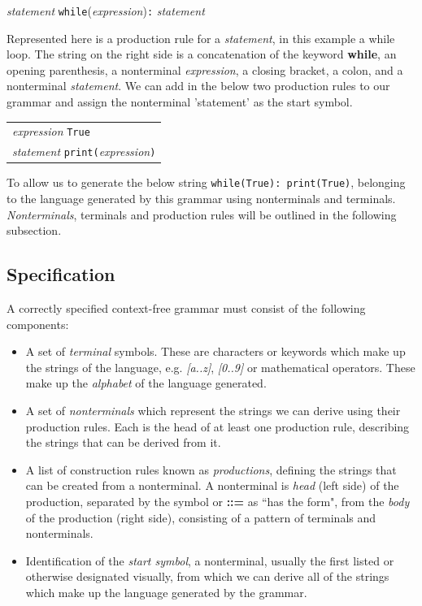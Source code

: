 \documentclass[a4paper, 11pt]{article}
\begin{document}
\begin{center}
	\textit{statement} \textbf{\textrightarrow} \texttt{while}(\textit{expression})\texttt{:} \textit{statement}
\end{center}

\noindent Represented here is a production rule for a \textit{statement}, in this example a while loop. The string on the right side is a concatenation of the keyword \textbf{while}, an opening parenthesis, a nonterminal \textit{expression}, a closing bracket, a colon, and a nonterminal \textit{statement}. We can add in the below two production rules to our grammar and assign the nonterminal 'statement' as the start symbol.

\begin{center}
	\begin{tabular}{l}
		\textit{expression} \textbf{\textrightarrow} \texttt{True} \\
		\textit{statement} \textbf{\textrightarrow} \texttt{print(}\textit{expression}\texttt{)}
	\end{tabular}
\end{center}

To allow us to generate the below string \texttt{while(True): print(True)}, belonging to the language generated by this grammar using nonterminals and terminals. \textit{Nonterminals}, terminals and production rules will be outlined in the following subsection.

\subsection{Specification}
A correctly specified context-free grammar must consist of the following components:

\begin{itemize}
	\item A set of \textit{terminal} symbols. These are characters or keywords which make up the strings of the language, e.g. \textit{[a..z]}, \textit{[0..9]} or mathematical operators. These make up the \textit{alphabet} of the language generated.

	\item A set of \textit{nonterminals} which represent the strings we can derive using their production rules. Each is the head of at least one production rule, describing the strings that can be derived from it.

	\item A list of construction rules known as \textit{productions}, defining the strings that can be created from a nonterminal. A nonterminal is \textit{head} (left side) of the production, separated by the symbol \textbf{\textrightarrow} or \textbf{::=} as ``has the form", from the \textit{body} of the production (right side), consisting of a pattern of terminals and nonterminals.

	\item Identification of the \textit{start symbol}, a nonterminal, usually the first listed or otherwise designated visually, from which we can derive all of the strings which make up the language generated by the grammar.
\end{itemize}
\end{document}
